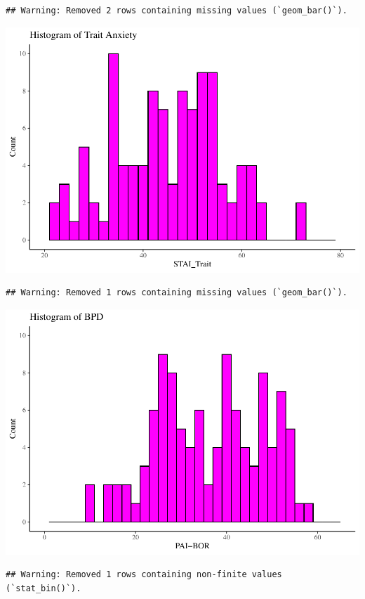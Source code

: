 \documentclass[
  man,floatsintext]{apa6}
\begin{document}
\begin{verbatim}
## Warning: Removed 2 rows containing missing values (`geom_bar()`).
\end{verbatim}

\includegraphics{d2m-Psychopathy_files/figure-latex/STAI-descriptives-1.pdf}

\begin{verbatim}
## Warning: Removed 1 rows containing missing values (`geom_bar()`).
\end{verbatim}

\includegraphics{d2m-Psychopathy_files/figure-latex/PAI-descriptives-1.pdf}

\begin{verbatim}
## Warning: Removed 1 rows containing non-finite values (`stat_bin()`).
\end{verbatim}
\end{document}

